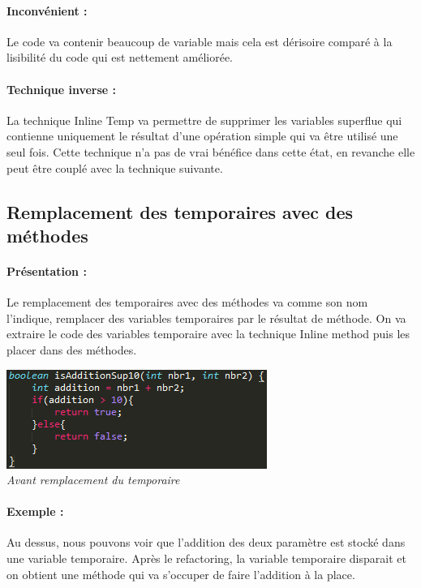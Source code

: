 \documentclass[a4paper,twoside,12pt,openright]{report}
\begin{document}
\paragraph{Inconvénient :}
Le code va contenir beaucoup de variable mais cela est dérisoire comparé à la lisibilité du code qui est nettement améliorée.

\paragraph{Technique inverse :}
La technique Inline Temp va permettre de supprimer les variables superflue qui contienne uniquement le résultat d'une opération simple qui va être utilisé une seul fois. Cette technique n'a pas de vrai bénéfice dans cette état, en revanche elle peut être couplé avec la technique suivante.\\

\subsection{Remplacement des temporaires avec des méthodes}
\paragraph{Présentation :}
Le remplacement des temporaires avec des méthodes va comme son nom l'indique, remplacer des variables temporaires par le résultat de méthode. On va extraire le code des variables temporaire avec la technique Inline method puis les placer dans des méthodes.

\begin{center}
\includegraphics[scale=1]{Image/Remplacement_Temp_Methode.png}\\
\itshape{Avant remplacement du temporaire}
\end{center}

\paragraph{Exemple :}
Au dessus, nous pouvons voir que l'addition des deux paramètre est stocké dans une variable temporaire. Après le refactoring, la variable temporaire disparait et on obtient une méthode qui va s'occuper de faire l'addition à la place.
\end{document}
